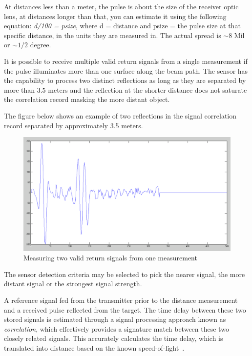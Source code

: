 At distances less than a meter, the pulse is about the size of the receiver optic lens, at distances longer than that, you can estimate it using the following equation: \textit{d/100 = psize}, where d = distance and psize = the pulse size at that specific distance, in the units they are measured in. The actual spread is $\sim 8$ Mil or $\sim1/2$ degree\cite{spreadofbeam}.

It is possible to receive multiple valid return signals from a single measurement if the pulse illuminates more than one surface along the beam path. The sensor has the capability to process two distinct reflections as long as they are separated by more than 3.5 meters and the reflection at the shorter distance does not saturate the correlation record masking the more distant object. 

The figure below shows an example of two reflections in the signal correlation record separated by approximately 3.5 meters.

\begin{figure}[H]
	\centering
	\includegraphics[scale=.2]{images/tworeflection.png}
	\caption{Measuring two valid return signals from one measurement~\cite{howtopulse}}
	\label{fig:tworeflections}
\end{figure}

The sensor detection criteria may be selected to pick the nearer signal, the more distant signal or the strongest signal strength.

A reference signal fed from the transmitter prior to the distance measurement and a received pulse reflected from the target. The time delay between these two stored signals is estimated through a signal processing approach known as \textit{correlation}, which effectively provides a signature match between these two closely related signals. This accurately calculates the time delay, which is translated into distance based on the known speed-of-light~\cite{howtopulse}.

